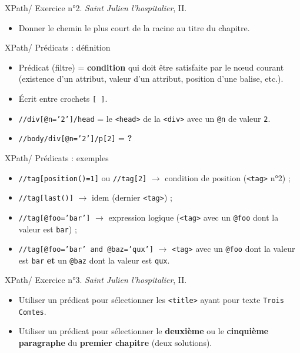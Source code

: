 \documentclass{beamer}
\begin{document}
    \begin{frame}{XPath/ Exercice n°2. \textit{Saint Julien l'hospitalier}, II.}
        \Large
        \begin{itemize}
            \item Donner le chemin le plus court de la racine au titre du chapitre.
        \end{itemize}
    \end{frame}

    \begin{frame}{XPath/ Prédicats : définition}
        \Large
        \begin{itemize}
            \item Prédicat (filtre) = \textbf{condition} qui doit être satisfaite par le n\oe ud courant (existence d'un attribut, valeur d'un attribut, position d'une balise, etc.).
            \item Écrit entre crochets \texttt{[ ]}.
            \bigskip
            \item \texttt{//div[@n='2']/head} = le \texttt{<head>} de la \texttt{<div>} avec un \texttt{@n} de valeur \texttt{2}.
            \bigskip
            \item \texttt{//body/div[@n='2']/p[2]} = \textbf{?}
        \end{itemize}
    \end{frame}

    \begin{frame}{XPath/ Prédicats : exemples}
        \Large
        \begin{itemize}
            \item \texttt{//tag[position()=1]} ou \texttt{//tag[2]} $\rightarrow$ condition de position (\texttt{<tag>} n°2) ;
            \bigskip
            \item \texttt{//tag[last()]} $\rightarrow$ idem (dernier \texttt{<tag>}) ;
            \bigskip
            \item \texttt{//tag[@foo='bar']} $\rightarrow$ expression logique (\texttt{<tag>} avec un \texttt{@foo} dont la valeur est \texttt{bar}) ;
            \bigskip
            \item \texttt{//tag[@foo='bar' and @baz='qux']} $\rightarrow$ \texttt{<tag>} avec un \texttt{@foo} dont la valeur est \texttt{bar} \textbf{et} un \texttt{@baz} dont la valeur est \texttt{qux}.
        \end{itemize}
    \end{frame}

    \begin{frame}{XPath/ Exercice n°3. \textit{Saint Julien l'hospitalier}, II.}
        \Large
        \begin{itemize}
            \item Utiliser un prédicat pour sélectionner les \texttt{<title>} ayant pour texte \texttt{Trois Comtes}.
            \bigskip
            \item Utiliser un prédicat pour sélectionner le \textbf{deuxième} ou le \textbf{cinquième paragraphe} du \textbf{premier chapitre} (deux solutions).
            \bigskip
            
        \end{itemize}
    \end{frame}
\end{document}
